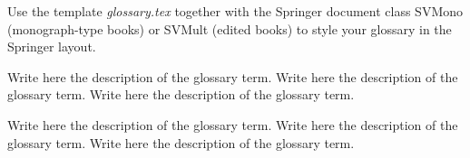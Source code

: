 Use the template \emph{glossary.tex} together with the Springer document class SVMono (monograph-type books) or SVMult (edited books) to style your glossary in the Springer layout.


 Write here the description of the glossary term. Write here the description of the glossary term. Write here the description of the glossary term.

 Write here the description of the glossary term. Write here the description of the glossary term. Write here the description of the glossary term.